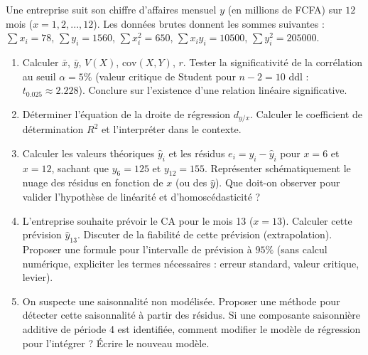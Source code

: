 \documentclass[11pt]{article}
\begin{document}
\begin{exercice}
Une entreprise suit son chiffre d'affaires mensuel $y$ (en millions de FCFA) sur $12$ mois ($x = 1, 2, ..., 12$). Les données brutes donnent les sommes suivantes :
$\sum x_i = 78$, $\sum y_i = 1560$, $\sum x_i^2 = 650$, $\sum x_i y_i = 10500$, $\sum y_i^2 = 205000$.
\begin{enumerate}
    \item Calculer $\bar{x}$, $\bar{y}$, $V(X)$, $\text{cov}(X,Y)$, $r$. Tester la significativité de la corrélation au seuil $\alpha = 5\%$ (valeur critique de Student pour $n-2=10$ ddl : $t_{0.025} \approx 2.228$). Conclure sur l'existence d'une relation linéaire significative.
    \item Déterminer l'équation de la droite de régression $d_{y/x}$. Calculer le coefficient de détermination $R^2$ et l'interpréter dans le contexte.
    \item Calculer les valeurs théoriques $\hat{y}_i$ et les résidus $e_i = y_i - \hat{y}_i$ pour $x=6$ et $x=12$, sachant que $y_6 = 125$ et $y_{12} = 155$. Représenter schématiquement le nuage des résidus en fonction de $x$ (ou des $\hat{y}$). Que doit-on observer pour valider l'hypothèse de linéarité et d'homoscédasticité ?
    \item L'entreprise souhaite prévoir le CA pour le mois 13 ($x=13$). Calculer cette prévision $\hat{y}_{13}$. Discuter de la fiabilité de cette prévision (extrapolation). Proposer une formule pour l'intervalle de prévision à $95\%$ (sans calcul numérique, expliciter les termes nécessaires : erreur standard, valeur critique, levier).
    \item On suspecte une saisonnalité non modélisée. Proposer une méthode pour détecter cette saisonnalité à partir des résidus. Si une composante saisonnière additive de période 4 est identifiée, comment modifier le modèle de régression pour l'intégrer ? Écrire le nouveau modèle.
\end{enumerate}
\end{exercice}
\end{document}
